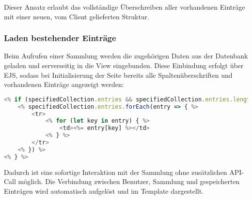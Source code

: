 Dieser Ansatz erlaubt das vollständige Überschreiben aller vorhandenen Einträge mit einer neuen, vom Client gelieferten Struktur.

\subsubsection{Laden bestehender Einträge}

Beim Aufrufen einer Sammlung werden die zugehörigen Daten aus der Datenbank geladen und serverseitig in die View eingebunden.
Diese Einbindung erfolgt über EJS, sodass bei Initialisierung der Seite bereits alle Spaltenüberschriften und vorhandenen Einträge angezeigt werden:

\begin{lstlisting}[language=JavaScript, caption=Darstellung in collections.ejs]
<% if (specifiedCollection.entries && specifiedCollection.entries.length > 0) { %>
    <% specifiedCollection.entries.forEach(entry => { %>
        <tr>
            <% for (let key in entry) { %>
                <td><%= entry[key] %></td>
            <% } %>
        </tr>
    <% }) %>
<% } %>
\end{lstlisting}

Dadurch ist eine sofortige Interaktion mit der Sammlung ohne zusätzlichen API-Call möglich.
Die Verbindung zwischen Benutzer, Sammlung und gespeicherten Einträgen wird automatisch aufgelöst und im Template dargestellt.

